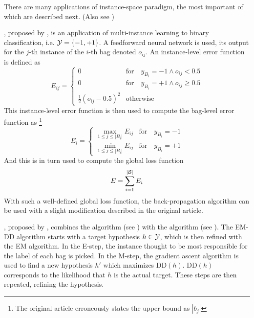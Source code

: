 There are many applications of instance-space paradigm, the most important of which are described next. (Also see \cite{andrews_support_2002} \cite{zhang_multiple_2006})

, proposed by \cite{zhou_neural_2002}, is an application of multi-instance learning to binary classification, i.e. \( \mathcal{Y} = \left\{ -1, +1 \right\} \). A feedforward neural network is used, its output for the \( j \)-th instance of the \( i \)-th bag denoted \( o_{ij} \). An instance-level error function is defined as
\[ E_{ij} = \begin{cases}
		0 &\text{for} \quad y_{B_i} = -1 \wedge o_{ij} < 0.5 \\
		0 &\text{for} \quad y_{B_i} = +1 \wedge o_{ij} \geq 0.5 \\
		\frac{1}{2} \left( o_{ij} - 0.5 \right)^2 &\text{otherwise}
	\end{cases} \]
This instance-level error function is then used to compute the bag-level error function as \footnote{The original article erroneously states the upper bound as \( \left\lvert b_j \right\rvert \)}
\[ E_i = \begin{cases}
		\max_{1 \leq j \leq \left\lvert B_i \right\rvert} E_{ij} &\text{for} \quad y_{B_i} = -1 \\
		\min_{1 \leq j \leq \left\lvert B_i \right\rvert} E_{ij} &\text{for} \quad y_{B_i} = +1
	\end{cases} \]
And this is in turn used to compute the global loss function
\[ E = \sum_{i = 1}^{\left\lvert \mathcal{B} \right\rvert} E_i \]
With such a well-defined global loss function, the back-propagation algorithm can be used with a slight modification described in the original article.

, proposed by \cite{zhang_em-dd:_2002}, combines the  algorithm (see \cite{dempster_maximum_1977}) with the  algorithm (see \cite{maron_framework_1998}). The EM-DD algorithm starts with a target hypothesis \( h \in \mathcal{Y} \), which is then refined with the EM algorithm. In the E-step, the instance thought to be most responsible for the label of each bag is picked. In the M-step, the gradient ascent algorithm is used to find a new hypothesis \( h' \) which maximizes \( \mathrm{DD} \left( h \right) \). \( \mathrm{DD} \left( h \right) \) corresponds to the likelihood that \( h \) is the actual target. These steps are then repeated, refining the hypothesis.


